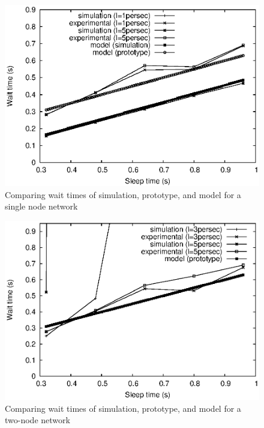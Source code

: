 \begin{figure}[t]
\centering
\includegraphics[scale=0.65]{figures/1node_both.eps}
\caption{Comparing wait times of simulation, prototype, and model for a single node network}
\label{fig:1node_both}
\end{figure}

\begin{figure}[t]
\centering
\includegraphics[scale=0.65]{figures/2node_both.eps}
\caption{Comparing wait times of simulation, prototype, and model for a two-node network}
\label{fig:2node_both}
\end{figure}


